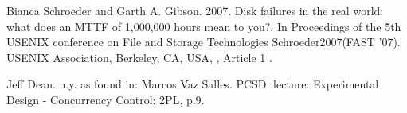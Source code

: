 \documentclass[12pt,a4paper]{article}
\begin{document}
\begin{thebibliography}{1}

 Bianca Schroeder and Garth A. Gibson. 2007. Disk failures in the real world: what does an MTTF of 1,000,000 hours mean to you?. In Proceedings of the 5th USENIX conference on File and Storage Technologies Schroeder2007(FAST '07). USENIX Association, Berkeley, CA, USA, , Article 1 .

 Jeff Dean. n.y. as found in: Marcos Vaz Salles. PCSD. lecture: Experimental Design - Concurrency Control: 2PL, p.9.

\end{thebibliography}
\end{document}
